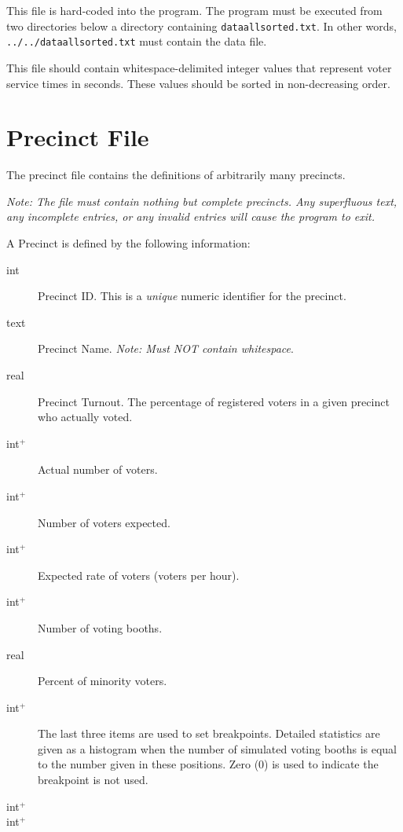This file is hard-coded into the program. The program must be executed from two directories below a directory containing \texttt{dataallsorted.txt}. In other words, \texttt{../../dataallsorted.txt} must contain the data file.

This file should contain whitespace-delimited integer values that represent voter service times in seconds. These values should be sorted in non-decreasing order.

\section{Precinct File} \label{hxtk-pct-file}

The precinct file contains the definitions of arbitrarily many precincts.

\vspace{0.5cm}

\emph{Note: The file must contain nothing but complete precincts. Any superfluous text, any incomplete entries, or any invalid entries will cause the program to exit.}

\vspace{0.5cm}

A Precinct is defined by the following information:

\begin{description}
\item[int] Precinct ID. This is a \emph{unique} numeric identifier for the precinct.
\item[text] Precinct Name. \emph{Note: Must NOT contain whitespace}.
\item[real] Precinct Turnout. The percentage of registered voters in a given precinct who actually voted.
\item[int$^+$] Actual number of voters.
\item[int$^+$] Number of voters expected.
\item[int$^+$] Expected rate of voters (voters per hour).
\item[int$^+$] Number of voting booths.
\item[real] Percent of minority voters.


\item[int$^+$] The last three items are used to set breakpoints. Detailed statistics are given as a histogram when the number of simulated voting booths is equal to the number given in these positions. Zero (0) is used to indicate the breakpoint is not used.
\item[int$^+$] 
\item[int$^+$] 
\end{description}

